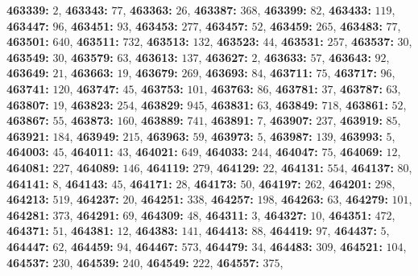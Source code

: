 \textsf{\bfseries 463339:} $2$, \textsf{\bfseries 463343:} $77$, \textsf{\bfseries 463363:} $26$, \textsf{\bfseries 463387:} $368$, \textsf{\bfseries 463399:} $82$, \textsf{\bfseries 463433:} $119$, \textsf{\bfseries 463447:} $96$, \textsf{\bfseries 463451:} $93$, \textsf{\bfseries 463453:} $277$, \textsf{\bfseries 463457:} $52$, \textsf{\bfseries 463459:} $265$, \textsf{\bfseries 463483:} $77$, \textsf{\bfseries 463501:} $640$, \textsf{\bfseries 463511:} $732$, \textsf{\bfseries 463513:} $132$, \textsf{\bfseries 463523:} $44$, \textsf{\bfseries 463531:} $257$, \textsf{\bfseries 463537:} $30$, \textsf{\bfseries 463549:} $30$, \textsf{\bfseries 463579:} $63$, \textsf{\bfseries 463613:} $137$, \textsf{\bfseries 463627:} $2$, \textsf{\bfseries 463633:} $57$, \textsf{\bfseries 463643:} $92$, \textsf{\bfseries 463649:} $21$, \textsf{\bfseries 463663:} $19$, \textsf{\bfseries 463679:} $269$, \textsf{\bfseries 463693:} $84$, \textsf{\bfseries 463711:} $75$, \textsf{\bfseries 463717:} $96$, \textsf{\bfseries 463741:} $120$, \textsf{\bfseries 463747:} $45$, \textsf{\bfseries 463753:} $101$, \textsf{\bfseries 463763:} $86$, \textsf{\bfseries 463781:} $37$, \textsf{\bfseries 463787:} $63$, \textsf{\bfseries 463807:} $19$, \textsf{\bfseries 463823:} $254$, \textsf{\bfseries 463829:} $945$, \textsf{\bfseries 463831:} $63$, \textsf{\bfseries 463849:} $718$, \textsf{\bfseries 463861:} $52$, \textsf{\bfseries 463867:} $55$, \textsf{\bfseries 463873:} $160$, \textsf{\bfseries 463889:} $741$, \textsf{\bfseries 463891:} $7$, \textsf{\bfseries 463907:} $237$, \textsf{\bfseries 463919:} $85$, \textsf{\bfseries 463921:} $184$, \textsf{\bfseries 463949:} $215$, \textsf{\bfseries 463963:} $59$, \textsf{\bfseries 463973:} $5$, \textsf{\bfseries 463987:} $139$, \textsf{\bfseries 463993:} $5$, \textsf{\bfseries 464003:} $45$, \textsf{\bfseries 464011:} $43$, \textsf{\bfseries 464021:} $649$, \textsf{\bfseries 464033:} $244$, \textsf{\bfseries 464047:} $75$, \textsf{\bfseries 464069:} $12$, \textsf{\bfseries 464081:} $227$, \textsf{\bfseries 464089:} $146$, \textsf{\bfseries 464119:} $279$, \textsf{\bfseries 464129:} $22$, \textsf{\bfseries 464131:} $554$, \textsf{\bfseries 464137:} $80$, \textsf{\bfseries 464141:} $8$, \textsf{\bfseries 464143:} $45$, \textsf{\bfseries 464171:} $28$, \textsf{\bfseries 464173:} $50$, \textsf{\bfseries 464197:} $262$, \textsf{\bfseries 464201:} $298$, \textsf{\bfseries 464213:} $519$, \textsf{\bfseries 464237:} $20$, \textsf{\bfseries 464251:} $338$, \textsf{\bfseries 464257:} $198$, \textsf{\bfseries 464263:} $63$, \textsf{\bfseries 464279:} $101$, \textsf{\bfseries 464281:} $373$, \textsf{\bfseries 464291:} $69$, \textsf{\bfseries 464309:} $48$, \textsf{\bfseries 464311:} $3$, \textsf{\bfseries 464327:} $10$, \textsf{\bfseries 464351:} $472$, \textsf{\bfseries 464371:} $51$, \textsf{\bfseries 464381:} $12$, \textsf{\bfseries 464383:} $141$, \textsf{\bfseries 464413:} $88$, \textsf{\bfseries 464419:} $97$, \textsf{\bfseries 464437:} $5$, \textsf{\bfseries 464447:} $62$, \textsf{\bfseries 464459:} $94$, \textsf{\bfseries 464467:} $573$, \textsf{\bfseries 464479:} $34$, \textsf{\bfseries 464483:} $309$, \textsf{\bfseries 464521:} $104$, \textsf{\bfseries 464537:} $230$, \textsf{\bfseries 464539:} $240$, \textsf{\bfseries 464549:} $222$, \textsf{\bfseries 464557:} $375$, 
